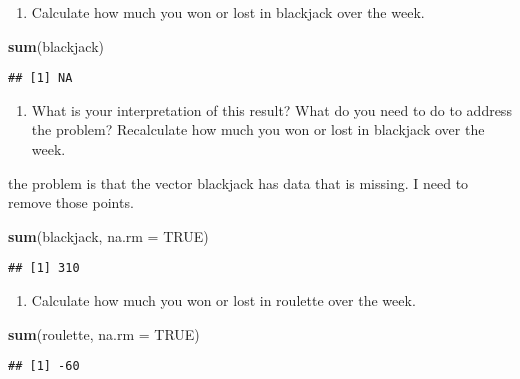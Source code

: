 \documentclass[]{article}
\newenvironment{Shaded}{\begin{snugshade}}{\end{snugshade}}
\newcommand{\DataTypeTok}[1]{\textcolor[rgb]{0.13,0.29,0.53}{#1}}
\newcommand{\KeywordTok}[1]{\textcolor[rgb]{0.13,0.29,0.53}{\textbf{#1}}}
\newcommand{\NormalTok}[1]{#1}
\newcommand{\OtherTok}[1]{\textcolor[rgb]{0.56,0.35,0.01}{#1}}
\providecommand{\tightlist}{%
  \setlength{\itemsep}{0pt}\setlength{\parskip}{0pt}}
\begin{document}
\begin{enumerate}
\def\labelenumi{\alph{enumi}.}
\setcounter{enumi}{1}
\tightlist
\item
  Calculate how much you won or lost in blackjack over the week.
\end{enumerate}

\begin{Shaded}
\begin{Highlighting}[]
\KeywordTok{sum}\NormalTok{(blackjack)}
\end{Highlighting}
\end{Shaded}

\begin{verbatim}
## [1] NA
\end{verbatim}

\begin{enumerate}
\def\labelenumi{\alph{enumi}.}
\setcounter{enumi}{2}
\tightlist
\item
  What is your interpretation of this result? What do you need to do to
  address the problem? Recalculate how much you won or lost in blackjack
  over the week.
\end{enumerate}

the problem is that the vector blackjack has data that is missing. I
need to remove those points.

\begin{Shaded}
\begin{Highlighting}[]
\KeywordTok{sum}\NormalTok{(blackjack, }\DataTypeTok{na.rm =} \OtherTok{TRUE}\NormalTok{)}
\end{Highlighting}
\end{Shaded}

\begin{verbatim}
## [1] 310
\end{verbatim}

\begin{enumerate}
\def\labelenumi{\alph{enumi}.}
\setcounter{enumi}{3}
\tightlist
\item
  Calculate how much you won or lost in roulette over the week.
\end{enumerate}

\begin{Shaded}
\begin{Highlighting}[]
\KeywordTok{sum}\NormalTok{(roulette, }\DataTypeTok{na.rm =} \OtherTok{TRUE}\NormalTok{)}
\end{Highlighting}
\end{Shaded}

\begin{verbatim}
## [1] -60
\end{verbatim}
\end{document}
